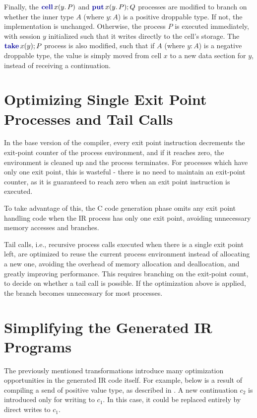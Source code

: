 Finally, the $\cellc{x}{y}{P}$ and $\putc{x}{y}{P}{Q}$ processes are modified to branch on whether the inner type $A$ (where $y: A$) is a positive droppable type. If not, the implementation is unchanged. Otherwise, the process $P$ is executed immediately, with session $y$ initialized such that it writes directly to the cell's storage. The $\takec{x}{y}{P}$ process is also modified, such that if $A$ (where $y: A$) is a negative droppable type, the value is simply moved from cell $x$ to a new data section for $y$, instead of receiving a continuation.

\section{Optimizing Single Exit Point Processes and Tail Calls} \label{section:SingleExitPointOptimizations}

In the base version of the compiler, every exit point instruction decrements the exit-point counter of the process environment, and if it reaches zero, the environment is cleaned up and the process terminates. For processes which have only one exit point, this is wasteful - there is no need to maintain an exit-point counter, as it is guaranteed to reach zero when an exit point instruction is executed.

To take advantage of this, the C code generation phase omits any exit point handling code when the \ac{IR} process has only one exit point, avoiding unnecessary memory accesses and branches.

Tail calls, i.e., recursive process calls executed when there is a single exit point left, are optimized to reuse the current process environment instead of allocating a new one, avoiding the overhead of memory allocation and deallocation, and greatly improving performance. This requires branching on the exit-point count, to decide on whether a tail call is possible. If the optimization above is applied, the branch becomes unnecessary for most processes.

\section{Simplifying the Generated IR Programs} \label{section:IRSimplification}

The previously mentioned transformations introduce many optimization opportunities in the generated \ac{IR} code itself. For example, below is a result of compiling a send of positive value type, as described in . A new continuation $c_2$ is introduced only for writing to $c_1$. In this case, it could be replaced entirely by direct writes to $c_1$.

